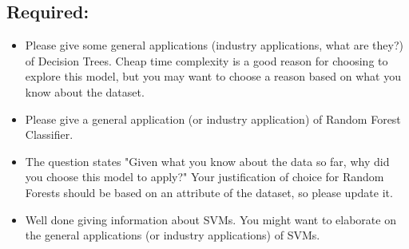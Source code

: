 \documentclass[12pt]{article}
\begin{document}
\subsection*{Required:}
\begin{itemize} 

\item Please give some general applications (industry applications, what are they?) of Decision Trees.
Cheap time complexity is a good reason for choosing to explore this model, but you may want to choose a reason based on what you know about the dataset.
\item Please give a general application (or industry application) of Random Forest Classifier.
\item The question states "Given what you know about the data so far, why did you choose this model to apply?" Your justification of choice for Random Forests should be based on an attribute of the dataset, so please update it.
\item Well done giving information about SVMs. You might want to elaborate on the general applications (or industry applications) of SVMs.
\end{itemize}

\end{document}
